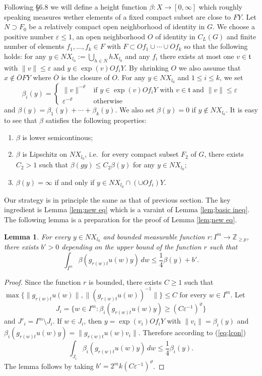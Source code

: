 \documentclass[12pt]{amsart}
\newtheorem{lem}[thm]{Lemma}
\theoremstyle{definition}
\theoremstyle{remark}
\numberwithin{equation}{section}
\begin{document}
Following  \cite{bq13} \S 6.8 we will define 
a height function $\beta:X\to [0, \infty]$ 
which roughly speaking measures wether 
elements of a fixed compact subset  are close to $FY$. 
Let $N\supset F_0$ be a relatively   compact open  neighborhood of identity  in $G$.
 We choose a positive number $\varepsilon\le 1 $, an open neighborhood $O$ of identity in $C_L(G)$
 and finite number of elements 
$f_1, \ldots, f_k\in F$ with $F\subset Of_1\cup \cdots \cup O f_k$
  so that the following holds:  for any $y\in NX_{l_0}:=\bigcup_{h\in N}hX_{l_0}$ and any $f_i$ 
  there exists at most one $v\in \mathfrak t$ with $\|v\|\le \varepsilon$ and $y\in \exp (v)Of_iY$. 
By shrinking $O$ we also assume that $x\not \in \overline O F Y$
where $\overline O$ is the closure of $O$.
For any $y\in NX_{l_0}$ and $1\le i\le k$, we set
\[
\beta_i(y)=\left\{\begin{array}{cl}
\|v\|^{-\vartheta} & \mbox{if }y\in \exp(v)Of_i Y \mbox{ with } v \in \mathfrak t \mbox{ and } \|v\|\le\varepsilon \\
\varepsilon ^{-\vartheta} & \mbox{otherwise} 
\end{array}
\right .
\]
and $\beta(y)=\beta_1(y)+\cdots+\beta_k(y)$.
We also set  $\beta(y)=0$ if $y\not\in NX_{l_0}$.
It is easy to see that $\beta$ satisfies the following properties:
\begin{enumerate}[label=(\Roman*)]
\item $\beta$ is lower semicontinous;
\item $\beta $ is Lipschitz on $NX_{l_0}$, i.e.~for every 
compact subset $F_2$ of $G$, there exists $C_2>1$ such that $\beta(gy)\le C_2\beta(y)$
for any $y\in NX_{l_0}$;
\item $\beta(y)=\infty$ if and only if $y\in NX_{l_0}\cap (\cup Of_i)Y$.

\end{enumerate}

Our strategy is in principle the same as that of  previous section. The key ingredient is 
Lemma \ref{lem;new eq} which is a varaint of Lemma \ref{lem;basic ineq}. The following
lemma is 
a preparation for the proof of Lemma \ref{lem;new eq}.

\begin{lem}\label{lem;lcontract}
For every $y\in NX_{l_0}$ and bounded measurable function $r: I^m\to \mathbb Z_{\ge p}$,
 there exists $b'>0$ depending on 
the upper bound of the function $r$ such that
\[
\int_{I^m}\beta(g_{r(w)t} u(w)y)\, dw\le  \frac{1}{4} \beta (y)+b'.
\]
\end{lem}
\begin{proof}
Since  the function $r$ is bounded, there exists $C\ge 1$ such  that 
$\max\{\|g_{r(w)t}u(w)\|,\|(g_{r(w)t}u(w))^{-1}\| \}\le C$ for every $w\in I^m$. 
Let $$J_i=\{w\in I^m: \beta_i (g_{r(w)t}u(w)y)\ge (C\varepsilon^{-1} )^{\vartheta} \}$$ 
and $J'_i=I^m \setminus J_i$.
If $w\in J_i$, then $y=\exp({v_i}) Of_i Y$ with $\|v_i\|=\beta_i (y)$ and
 $\beta_i (g_{r(w)t}u(w)y)=\|g_{r(w)t}u(w)v_i\|$. Therefore  according to (\ref{eq;lcon})
\[
\int_{J_i}\beta_i(g_{r(w)t} u(w)y)\,dw\le  \frac{1}{4}\beta _i(y).
\]
The lemma follows by taking 
$b'=2^mk(C\varepsilon^{-1} )^{\vartheta}$.
\end{proof}
\end{document}
